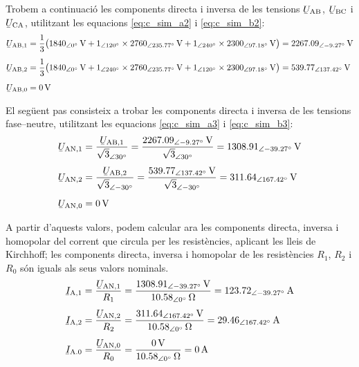 \begin{exemple}
    Trobem a continuaci\'{o} les components directa i inversa de les
    tensions $\cmplx{U}\ped{AB}$, $\cmplx{U}\ped{BC}$ i
    $\cmplx{U}\ped{CA}$, utilitzant les equacions
    \eqref{eq:c_sim_a2} i \eqref{eq:c_sim_b2}:
    \begin{align*}
    \cmplx{U}\ped{AB,1} &= \frac{1}{3} \big(
    \SIpd{1840}{0}{V} + \numpd{1}{120} \times \SIpd{2760}{235,77}{V} +
    \numpd{1}{240} \times \SIpd{2300}{97,18}{V}\big) = \SIpd{2267,09}{-9,27}{V} \\[1ex]
    \cmplx{U}\ped{AB,2} &= \frac{1}{3} \big(
    \SIpd{1840}{0}{V} + \numpd{1}{240} \times \SIpd{2760}{235,77}{V} +
    \numpd{1}{120} \times \SIpd{2300}{97,18}{V} \big) = \SIpd{539,77}{137,42}{V} \\[1ex]
    \cmplx{U}\ped{AB,0} &= \SI{0}{V}
    \end{align*}

    El seg\"{u}ent pas consisteix a trobar les components directa i inversa
    de les tensions fase--neutre, utilitzant les equacions
    \eqref{eq:c_sim_a3} i \eqref{eq:c_sim_b3}:
    \begin{align*}
    \cmplx{U}\ped{AN,1} &=
    \frac{\cmplx{U}\ped{AB,1}}{\sqrt{3}_{\angle\ang{30}}} =
    \frac{\SIpd{2267,09}{-9,27}{V}}{\sqrt{3}_{\angle\ang{30}}} =
    \SIpd{1308,91}{-39,27}{V} \\[1ex]
    \cmplx{U}\ped{AN,2} &=
    \frac{\cmplx{U}\ped{AB,2}}{\sqrt{3}_{\angle\ang{-30}}} =
    \frac{\SIpd{539,77}{137,42}{V}}{\sqrt{3}_{\angle\ang{-30}}} =
    \SIpd{311,64}{167,42}{V} \\[1ex]
    \cmplx{U}\ped{AN,0} &= \SI{0}{V}
    \end{align*}

    A partir d'aquests valors, podem calcular ara les components
    directa, inversa i homopolar del corrent que circula per les
    resist\`{e}ncies, aplicant les lleis de Kirchhoff; les components
    directa, inversa i homopolar de les resist\`{e}ncies $R_1$,
    $R_2$ i $R_0$ s\'{o}n iguals als seus valors nominals.
    \begin{align*}
    \cmplx{I}\ped{A,1} &=
    \frac{\cmplx{U}\ped{AN,1}}{R_1} =
    \frac{\SIpd{1308,91}{-39,27}{V}}{\SIpd{10,58}{0}{\ohm}} =
    \SIpd{123,72}{-39,27}{A} \\[1ex]
    \cmplx{I}\ped{A,2} &=
    \frac{\cmplx{U}\ped{AN,2}}{R_2} =
    \frac{\SIpd{311,64}{167,42}{V}}{\SIpd{10,58}{0}{\ohm}} =
    \SIpd{29,46}{167,42}{A} \\[1ex]
    \cmplx{I}\ped{A.0} &=
    \frac{\cmplx{U}\ped{AN,0}}{R_0} =
    \frac{\SI{0}{V}}{\SIpd{10,58}{0}{\ohm}} =
    \SI{0}{A}
    \end{align*}


\end{exemple}
